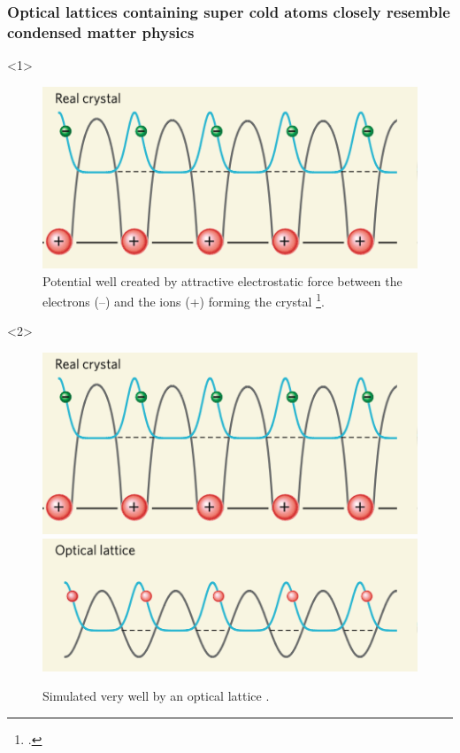 \documentclass[aspectratio=169]{beamer}
\begin{document}
\begin{frame}
  \frametitle{Optical lattices containing super cold atoms closely resemble condensed matter physics
  }
  \begin{onlyenv}<1>
    \begin{figure}
      \includegraphics[scale=0.4]{../img/real-crystal.png}
      \caption{Potential well created by attractive electrostatic force between the electrons (–) and the ions (+) forming the crystal \footcite{Greiner2008}.}
    \end{figure}
  \end{onlyenv}
  \begin{onlyenv}<2>
    \begin{figure}
      \includegraphics[scale=0.4]{../img/real-crystal.png} \\
      \includegraphics[scale=0.4]{../img/lattice.png}
      \caption{Simulated very well by an optical lattice \footnotemark[1].}
    \end{figure}
  \end{onlyenv}
\end{frame}
\end{document}
